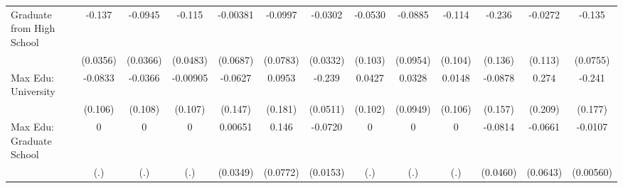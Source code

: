 {\begin{tabular}{l*{12}{c}}
\addlinespace
Graduate from High School&      -0.137\sym{***}&     -0.0945\sym{**} &      -0.115\sym{*}  &    -0.00381         &     -0.0997         &     -0.0302         &     -0.0530         &     -0.0885         &      -0.114         &      -0.236         &     -0.0272         &      -0.135         \\
            &    (0.0356)         &    (0.0366)         &    (0.0483)         &    (0.0687)         &    (0.0783)         &    (0.0332)         &     (0.103)         &    (0.0954)         &     (0.104)         &     (0.136)         &     (0.113)         &    (0.0755)         \\
\addlinespace
Max Edu: University&     -0.0833         &     -0.0366         &    -0.00905         &     -0.0627         &      0.0953         &      -0.239\sym{***}&      0.0427         &      0.0328         &      0.0148         &     -0.0878         &       0.274         &      -0.241         \\
            &     (0.106)         &     (0.108)         &     (0.107)         &     (0.147)         &     (0.181)         &    (0.0511)         &     (0.102)         &    (0.0949)         &     (0.106)         &     (0.157)         &     (0.209)         &     (0.177)         \\
\addlinespace
Max Edu: Graduate School&           0         &           0         &           0         &     0.00651         &       0.146         &     -0.0720\sym{***}&           0         &           0         &           0         &     -0.0814         &     -0.0661         &     -0.0107         \\
            &         (.)         &         (.)         &         (.)         &    (0.0349)         &    (0.0772)         &    (0.0153)         &         (.)         &         (.)         &         (.)         &    (0.0460)         &    (0.0643)         &   (0.00560)         \\
\bottomrule
\end{tabular}
}
